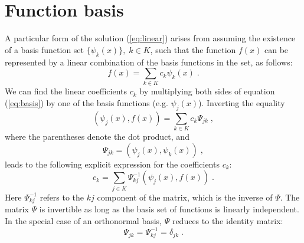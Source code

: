 


\section{Function basis}
A particular form of the solution (\ref{eq:linear}) arises from
assuming the existence of a basis function set $\{\psi_k(x)\},\;k \in
K$, such that the function $f (x)$ can be represented by a linear
combination of the basis functions in the set, as follows:
\begin{equation}\label{eq:basis}
  f (x) = \sum_{k \in K} c_k \psi_k (x)\;.
\end{equation}
We can find the linear coefficients $c_k$ by multiplying both
sides of equation (\ref{eq:basis}) by one of the basis functions
(e.g. $\psi_j (x)$). Inverting the equality
\begin{equation}\label{eq:dotprod}
  \left( \psi_j (x), f (x)\right) = \sum_{k \in K} c_k \Psi_{jk}\;,
\end{equation}
where the parentheses denote the dot product, and
\begin{equation}\label{eq:psi0}
\Psi_{jk} = \left( \psi_j (x), \psi_k (x)\right) \;,
\end{equation}
leads to the following explicit expression for the coefficients
$c_k$:
\begin{equation}\label{eq:ck}
  c_k = \sum_{j \in K} \Psi^{-1}_{kj} \left( \psi_j (x), f
  (x)\right) \;.
\end{equation}
Here $\Psi^{-1}_{kj}$ refers to the $kj$ component of the matrix,
which is the inverse of $\Psi$.  The matrix $\Psi$ is invertible as
long as the basis set of functions is linearly independent. In the
special case of an orthonormal basis, $\Psi$ reduces to the identity
matrix:
\begin{equation}
\label{eqn:deltajk}
\Psi_{jk} = \Psi^{-1}_{kj} = \delta_{jk}\;.
\end{equation}

